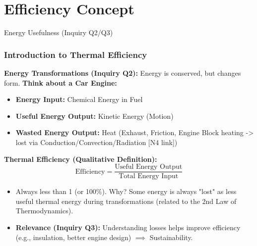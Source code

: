 \documentclass[xcolor=svgnames]{beamer}
\begin{document}
\section{Efficiency Concept}
\begin{frame}{Energy Usefulness (Inquiry Q2/Q3)}
    \frametitle{Introduction to Thermal Efficiency}
    \textbf{Energy Transformations (Inquiry Q2):} Energy is conserved, but changes form.
    \vspace{1em}
    \textbf{Think about a Car Engine:}
    \begin{itemize}
        \item \textbf{Energy Input:} Chemical Energy in Fuel
        \item \textbf{Useful Energy Output:} Kinetic Energy (Motion)
        \item \textbf{Wasted Energy Output:} Heat (Exhaust, Friction, Engine Block heating -> lost via Conduction/Convection/Radiation [N4 link])
    \end{itemize}
    \vspace{1em}
    \textbf{Thermal Efficiency (Qualitative Definition):}
    \[ \text{Efficiency} = \frac{\text{Useful Energy Output}}{\text{Total Energy Input}} \]
    \begin{itemize}
        \item Always less than 1 (or 100\%). Why? Some energy is always "lost" as less useful thermal energy during transformations (related to the 2nd Law of Thermodynamics).
        \item \textbf{Relevance (Inquiry Q3):} Understanding losses helps improve efficiency (e.g., insulation, better engine design) $\implies$ Sustainability.
    \end{itemize}
\end{frame}
\end{document}
